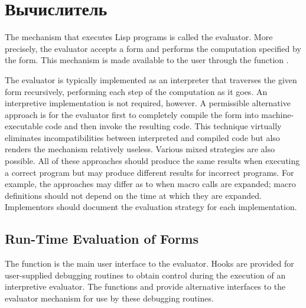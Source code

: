 
\clearpage\def\pagestatus{FINAL PROOF}

\ifx \rulang\Undef

\chapter{Вычислитель}

The mechanism that executes Lisp programs is called the evaluator.
More precisely, the evaluator accepts a form and performs the
computation specified by the form.  This mechanism is made available
to the user through the function .

The evaluator is typically implemented as an interpreter
that traverses the given form recursively, performing each step
of the computation as it goes.  An interpretive implementation is not
required, however.  A permissible alternative approach is
for the evaluator first to completely compile the form into
machine-executable code and then invoke the resulting code.
This technique virtually eliminates incompatibilities
between interpreted and compiled code but also renders the 
mechanism relatively useless.
Various mixed strategies are also possible.  All of these approaches
should produce the same results when executing a correct program
but may produce different results for incorrect programs.
For example, the approaches may differ as to when macro calls
are expanded; macro definitions should not depend on the time
at which they are expanded.  Implementors should
document the evaluation strategy for each implementation.

\section{Run-Time Evaluation of Forms}

The function  is the main user interface to the evaluator.
Hooks are provided for user-supplied debugging routines
to obtain control during the execution of an interpretive evaluator.
The functions  and  provide alternative
interfaces to the evaluator mechanism for use by these debugging routines.

